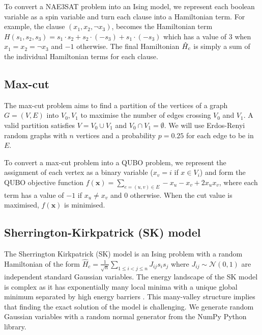 To convert a NAE3SAT problem into an Ising model, we represent each boolean variable as a spin variable and turn each clause into a Hamiltonian term. For example, the clause $(x_1, x_2, \neg x_3)$, becomes the Hamiltonian term $H(s_1, s_2, s_3) = s_1 \cdot s_2 + s_2 \cdot (-s_3) + s_1 \cdot (-s_3)$ which has a value of $3$ when $x_1=x_2=\neg x_3$ and $-1$ otherwise. The final Hamiltonian $\Hat{H}_c$ is simply a sum of the individual Hamiltonian terms for each clause.

\subsection*{Max-cut}
The max-cut problem aims to find a partition of the vertices of a graph $G = (V, E)$ into $V_0, V_1$ to maximise the number of edges crossing $V_0$ and $V_1$. A valid partition satisfies $V = V_0 \cup V_1$ and $V_0 \cap V_1 = \emptyset$. We will use Erdos-Renyi random graphs with $n$ vertices and a probability $p=0.25$ for each edge to be in $E$.

To convert a max-cut problem into a QUBO problem, we represent the assignment of each vertex as a binary variable ($x_v = i$ if $x \in V_i$) and form the QUBO objective function $f(\mathbf{x}) = \sum_{e = (u, v) \in E} -x_u - x_v + 2x_u x_v$, where each term has a value of $-1$ if $x_u  \neq x_v$ and $0$ otherwise. When the cut value is maximised, $f(\mathbf{x})$ is minimised. 

\subsection*{Sherrington-Kirkpatrick (SK) model}
The Sherrington Kirkpatrick (SK) model is an Ising problem with a random Hamiltonian of the form $\hat{H}_c = \frac{1}{\sqrt{n}} \sum_{1 \leq i < j \leq n} J_{ij}s_i s_j$
where $J_{ij} \sim \mathcal{N}(0,1)$ are independent standard Gaussian variables. The energy landscape of the SK model is complex as it has exponentially many local minima with a unique global minimum separated by high energy barriers \cite{skmodel}. This many-valley structure implies that finding the exact solution of the model is challenging. We generate random Gaussian variables with a random normal generator from the NumPy Python library.


